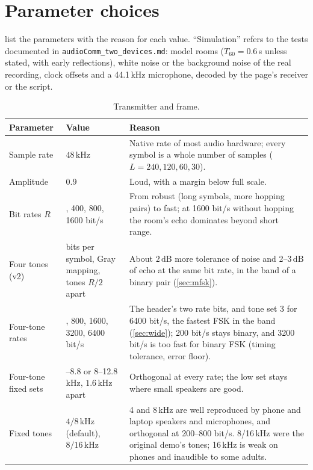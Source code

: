\documentclass[11pt,a4paper]{article}
\newcommand{\kHz}{\,\mathrm{kHz}}
\newcommand{\dB}{\,\mathrm{dB}}
\newcommand{\code}[1]{\texttt{#1}}
\theoremstyle{remark}
\begin{document}
\section{Parameter choices}
\label{sec:params}
 list the parameters with the reason for each value. ``Simulation'' refers to the tests documented in \code{audioComm\_two\_devices.md}: model rooms ($T_{60} = 0.6$\,s unless stated, with early reflections), white noise or the background noise of the real recording, clock offsets and a 44.1\,kHz microphone, decoded by the page's receiver or the script.

\begin{table}[p]
\centering
\caption{Transmitter and frame.}
\label{tab:ptx}
\small
\begin{tabularx}{\linewidth}{>{\raggedright\arraybackslash}p{3.4cm}>{\raggedright\arraybackslash}p{3.1cm}X}
\toprule
Parameter & Value & Reason\\
\midrule
Sample rate & $48\kHz$ & Native rate of most audio hardware; every symbol is a whole number of samples ($L = 240, 120, 60, 30$).\\
Amplitude & $0.9$ & Loud, with a margin below full scale.\\
Bit rates $R$ & 200, 400, 800, 1600 bit/s & From robust (long symbols, more hopping pairs) to fast; at 1600 bit/s without hopping the room's echo dominates beyond short range.\\
Four tones (v2) & 2 bits per symbol, Gray mapping, tones $R/2$ apart & About $2\dB$ more tolerance of noise and 2--$3\dB$ of echo at the same bit rate, in the band of a binary pair (\cref{sec:mfsk}).\\
Four-tone rates & 400, 800, 1600, 3200, 6400 bit/s & The header's two rate bits, and tone set 3 for 6400 bit/s, the fastest FSK in the band (\cref{sec:wide}); 200 bit/s stays binary, and 3200 bit/s is too fast for binary FSK (timing tolerance, error floor).\\
Four-tone fixed sets & 4--8.8 or 8--12.8\,kHz, $1.6\kHz$ apart & Orthogonal at every rate; the low set stays where small speakers are good.\\
Fixed tones & $4/8\kHz$ (default), $8/16\kHz$ & 4 and 8\,kHz are well reproduced by phone and laptop speakers and microphones, and orthogonal at 200--800 bit/s. 8/16\,kHz were the original demo's tones; 16\,kHz is weak on phones and inaudible to some adults.\\

\end{tabularx}
\end{table}
\end{document}
